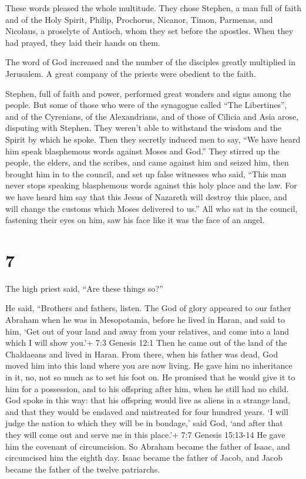  These words pleased the whole multitude. They chose
Stephen, a man full of faith and of the Holy Spirit, Philip, Prochorus,
Nicanor, Timon, Parmenas, and Nicolaus, a proselyte of Antioch,
 whom they set before the apostles. When they had prayed,
they laid their hands on them.

 The word of God increased and the number of the disciples
greatly multiplied in Jerusalem. A great company of the priests were
obedient to the faith.

 Stephen, full of faith and power, performed great wonders
and signs among the people.  But some of those who were of
the synagogue called ``The Libertines'', and of the Cyrenians, of the
Alexandrians, and of those of Cilicia and Asia arose, disputing with
Stephen.  They weren't able to withstand the wisdom and the
Spirit by which he spoke.  Then they secretly induced men
to say, ``We have heard him speak blasphemous words against Moses and
God.''  They stirred up the people, the elders, and the
scribes, and came against him and seized him, then brought him in to the
council,  and set up false witnesses who said, ``This man
never stops speaking blasphemous words against this holy place and the
law.  For we have heard him say that this Jesus of Nazareth
will destroy this place, and will change the customs which Moses
delivered to us.''  All who sat in the council, fastening
their eyes on him, saw his face like it was the face of an angel.

\hypertarget{section-6}{%
\section{7}\label{section-6}}

 The high priest said, ``Are these things so?''

 He said, ``Brothers and fathers, listen. The God of glory
appeared to our father Abraham when he was in Mesopotamia, before he
lived in Haran,  and said to him, `Get out of your land and
away from your relatives, and come into a land which I will show you.'+
7:3 Genesis 12:1  Then he came out of the land of the
Chaldaeans and lived in Haran. From there, when his father was dead, God
moved him into this land where you are now living.  He gave
him no inheritance in it, no, not so much as to set his foot on. He
promised that he would give it to him for a possession, and to his
offspring after him, when he still had no child.  God spoke
in this way: that his offspring would live as aliens in a strange land,
and that they would be enslaved and mistreated for four hundred years.
 `I will judge the nation to which they will be in bondage,'
said God, `and after that they will come out and serve me in this
place.'+ 7:7 Genesis 15:13-14  He gave him the covenant of
circumcision. So Abraham became the father of Isaac, and circumcised him
the eighth day. Isaac became the father of Jacob, and Jacob became the
father of the twelve patriarchs.

